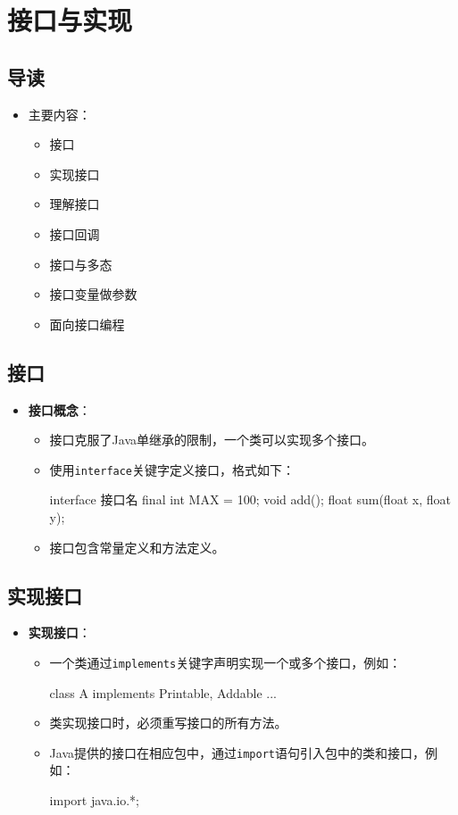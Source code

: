 \documentclass[a4paper, 10pt]{ctexart}
\begin{document}
\section{接口与实现}

\subsection{导读}
\begin{itemize}
  \item 主要内容：
  \begin{itemize}
    \item 接口
    \item 实现接口
    \item 理解接口
    \item 接口回调
    \item 接口与多态
    \item 接口变量做参数
    \item 面向接口编程
  \end{itemize}
\end{itemize}

\subsection{接口}
\begin{itemize}
  \item \textbf{接口概念}：
  \begin{itemize}
    \item 接口克服了Java单继承的限制，一个类可以实现多个接口。
    \item 使用\texttt{interface}关键字定义接口，格式如下：
    \begin{codeblock}
interface 接口名 {
    final int MAX = 100;
    void add();
    float sum(float x, float y);
}
    \end{codeblock}
    \item 接口包含常量定义和方法定义。
  \end{itemize}
\end{itemize}

\subsection{实现接口}
\begin{itemize}
  \item \textbf{实现接口}：
  \begin{itemize}
    \item 一个类通过\texttt{implements}关键字声明实现一个或多个接口，例如：
    \begin{codeblock}
class A implements Printable, Addable {
    ...
}
    \end{codeblock}
    \item 类实现接口时，必须重写接口的所有方法。
    \item Java提供的接口在相应包中，通过\texttt{import}语句引入包中的类和接口，例如：
    \begin{codeblock}
import java.io.*;
    \end{codeblock}
  \end{itemize}
\end{itemize}
\end{document}
